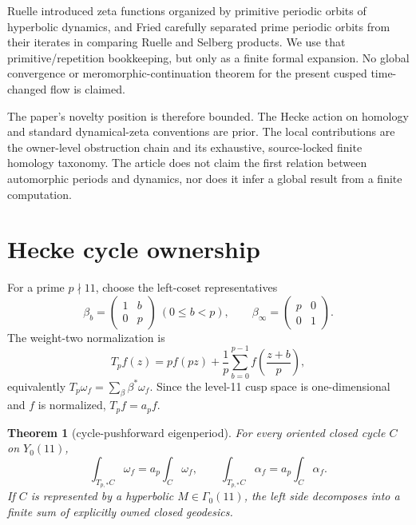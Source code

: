 \documentclass[11pt]{article}
\newtheorem{theorem}{Theorem}[section]
\theoremstyle{definition}
\theoremstyle{remark}
\newcommand{\G}{\Gamma_0(11)}
\begin{document}
Ruelle introduced zeta functions organized by primitive periodic orbits of hyperbolic dynamics, and Fried carefully separated prime periodic orbits from their iterates in comparing Ruelle and Selberg products.
\citep[Introduction and flow case]{ruelle1976}
\citep[Section~2]{fried1986}
We use that primitive/repetition bookkeeping, but only as a finite formal expansion. No global convergence or meromorphic-continuation theorem for the present cusped time-changed flow is claimed.

The paper's novelty position is therefore bounded. The Hecke action on homology and standard dynamical-zeta conventions are prior. The local contributions are the owner-level obstruction chain and its exhaustive, source-locked finite homology taxonomy. The article does not claim the first relation between automorphic periods and dynamics, nor does it infer a global result from a finite computation.

\section{Hecke cycle ownership}

For a prime $p\nmid11$, choose the left-coset representatives
\[
\beta_b=\begin{pmatrix}1&b\\0&p\end{pmatrix}\ (0\leq b<p),
\qquad
\beta_\infty=\begin{pmatrix}p&0\\0&1\end{pmatrix}.
\]
The weight-two normalization is
\[
T_pf(z)=pf(pz)+\frac1p\sum_{b=0}^{p-1}f\!\left(\frac{z+b}{p}\right),
\]
equivalently $T_p\omega_f=\sum_\beta\beta^*\omega_f$. Since the level-11 cusp space is one-dimensional and $f$ is normalized, $T_pf=a_pf$.

\begin{theorem}[cycle-pushforward eigenperiod]\label{thm:hecke}
For every oriented closed cycle $C$ on $Y_0(11)$,
\[
\int_{T_{p,*}C}\omega_f=a_p\int_C\omega_f,
\qquad
\int_{T_{p,*}C}\alpha_f=a_p\int_C\alpha_f.
\]
If $C$ is represented by a hyperbolic $M\in\G$, the left side decomposes into a finite sum of explicitly owned closed geodesics.
\end{theorem}
\end{document}
